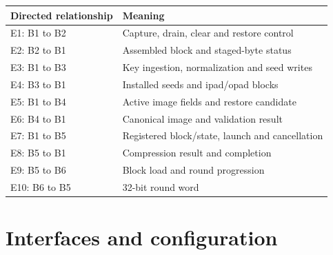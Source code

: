 \documentclass[11pt,a4paper]{article}
\begin{document}
{\small\renewcommand{\arraystretch}{1.18}\begin{longtable}{@{}L{0.24\textwidth}|L{0.7\textwidth}@{}}\toprule

\textbf{Directed relationship} & \textbf{Meaning}\\\midrule\endhead

E1: B1 to B2 & Capture,\allowbreak{} drain,\allowbreak{} clear and restore control\\[2pt]\hline

E2: B2 to B1 & Assembled block and staged-byte status\\[2pt]\hline

E3: B1 to B3 & Key ingestion,\allowbreak{} normalization and seed writes\\[2pt]\hline

E4: B3 to B1 & Installed seeds and ipad/\allowbreak{}opad blocks\\[2pt]\hline

E5: B1 to B4 & Active image fields and restore candidate\\[2pt]\hline

E6: B4 to B1 & Canonical image and validation result\\[2pt]\hline

E7: B1 to B5 & Registered block/\allowbreak{}state,\allowbreak{} launch and cancellation\\[2pt]\hline

E8: B5 to B1 & Compression result and completion\\[2pt]\hline

E9: B5 to B6 & Block load and round progression\\[2pt]\hline

E10: B6 to B5 & 32-bit round word\\[2pt]\hline

\bottomrule\end{longtable}}

\section{Interfaces and configuration}
\end{document}
